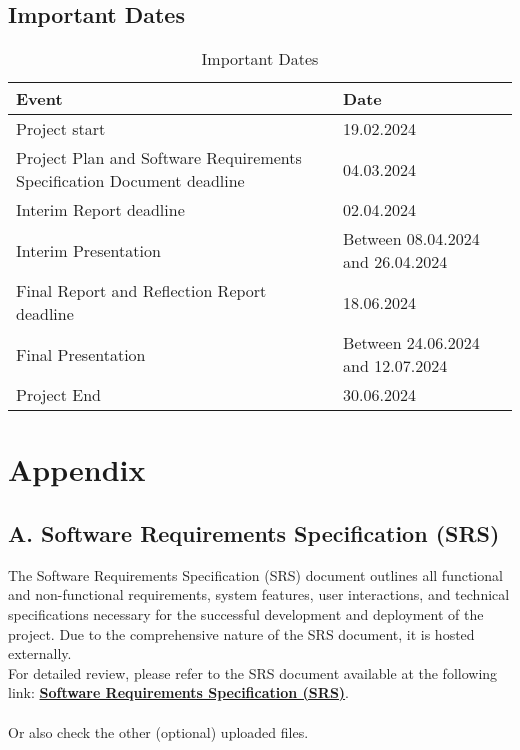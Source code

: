 \documentclass[12pt,a4paper]{article}
\begin{document}
\subsection{Important Dates}

\begin{table}[h!]
\centering
\begin{adjustbox}{scale=1,center}
\begin{tabular}{|p{8cm}|p{7cm}|} %
\hline
\textbf{Event} & \textbf{Date} \\
\hline
Project start & 19.02.2024 \\ \hline
Project Plan and Software Requirements Specification Document deadline & 04.03.2024 \\ \hline
Interim Report deadline & 02.04.2024 \\ \hline
Interim Presentation & Between 08.04.2024 and 26.04.2024 \\ \hline
Final Report and Reflection Report deadline & 18.06.2024 \\ \hline
Final Presentation & Between 24.06.2024 and 12.07.2024 \\ \hline
Project End & 30.06.2024 \\
\hline
\end{tabular}
\end{adjustbox}
\caption{Important Dates}
\end{table}
\vspace{\baselineskip} %


\newpage
\appendix
\section*{Appendix}
\subsection*{A. Software Requirements Specification (SRS)}
The Software Requirements Specification (SRS) document outlines all functional and non-functional requirements, system features, user interactions, and technical specifications necessary for the successful development and deployment of the project. Due to the comprehensive nature of the SRS document, it is hosted externally. \\ For detailed review, please refer to the SRS document available at the following link: \href{https://github.com/Warglaive/ProjectPlanFontys/blob/main/Appendix_A_SRS.pdf}{\textbf{Software Requirements Specification (SRS)}}. \\ \\ Or also check the other (optional) uploaded files.
\end{document}
